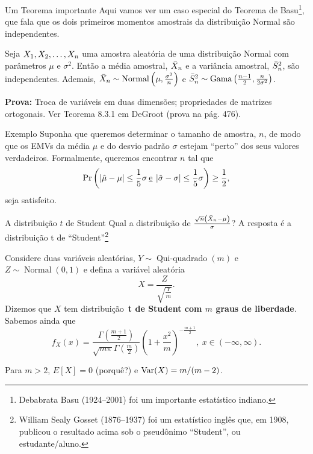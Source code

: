 \begin{frame}{Um Teorema importante}
 Aqui vamos ver um caso especial do Teorema de Basu\footnote{Debabrata Basu (1924--2001) foi um importante estatístico indiano.}, que fala que os dois primeiros momentos amostrais da distribuição Normal são independentes.
 \begin{theo}
  Seja $X_1, X_2, \ldots, X_n$ uma amostra aleatória de uma distribuição Normal com parâmetros $\mu$ e $\sigma^2$.
  Então a média amostral, $\bar{X}_n$ e a variância amostral, $\bar{S}^2_n$, são independentes.
  Ademais, $\bar{X}_n \sim \operatorname{Normal}\left(\mu, \frac{\sigma^2}{n}\right)$ e $\bar{S}^2_n \sim \operatorname{Gama}\left(\frac{n-1}{2},  \frac{n}{2\sigma^2}\right)$.
 \end{theo}
\textbf{Prova:} Troca de variáveis em duas dimensões; propriedades de matrizes ortogonais.
Ver Teorema 8.3.1 em DeGroot (prova na pág. 476).
\end{frame}

\begin{frame}{Exemplo}
 Suponha que queremos determinar o tamanho de amostra, $n$, de modo que os EMVs da média $\mu$ e do desvio padrão $\sigma$ estejam ``perto'' dos seus valores verdadeiros.
 Formalmente, queremos encontrar $n$ tal que
 \[ \operatorname{Pr}\left( \left|\hat{\mu} - \mu\right| \leq \frac{1}{5}\sigma \: \text{\underline{e}} \: \left|\hat{\sigma}-\sigma\right| \leq  \frac{1}{5}\sigma \right) \geq \frac{1}{2} ,\]
 seja satisfeito.
\end{frame}

\begin{frame}{A distribuição $t$ de Student}
 Qual a distribuição de $\frac{\sqrt{n}\left(\bar{X}_n - \mu\right)}{\sigma}$?
 A resposta é a distribuição t de ``Student''\footnote{William Sealy Gosset (1876--1937) foi um estatístico inglês que, em 1908, publicou o resultado acima sob o pseudônimo ``Student'', ou estudante/aluno.}
 
 \begin{defn}[A distribuição t]
  Considere duas variáveis aleatórias, $Y \sim\operatorname{Qui-quadrado}(m)$ e $Z \sim\operatorname{Normal}(0, 1)$ e defina a variável aleatória
  \[ X = \frac{Z}{\sqrt{\frac{Y}{m}}}. \]
 Dizemos que $X$  tem distribuição~\textbf{t de Student com $m$ graus de liberdade}. 
 Sabemos ainda que
 \[f_X(x) = \frac{\Gamma(\frac{m + 1}{2})}{\sqrt{m\pi}\Gamma(\frac{m}{2})} \left(1 + \frac{x^2}{m}\right)^{-\frac{m+1}{2}},\: x \in (-\infty, \infty). \]
 \end{defn}
Para $m>2$, $E[X] = 0$ (porquê?) e $\operatorname{Var}(X) = m/(m-2)$.
\end{frame}

